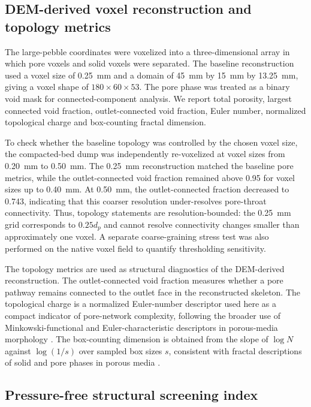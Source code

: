\documentclass[preprint,12pt,authoryear]{elsarticle}
\begin{document}
\subsection{DEM-derived voxel reconstruction and topology metrics}

The large-pebble coordinates were voxelized into a three-dimensional array in which pore voxels and solid voxels were separated. The baseline reconstruction used a voxel size of \SI{0.25}{mm} and a domain of \SI{45}{mm} by \SI{15}{mm} by \SI{13.25}{mm}, giving a voxel shape of $180 \times 60 \times 53$. The pore phase was treated as a binary void mask for connected-component analysis. We report total porosity, largest connected void fraction, outlet-connected void fraction, Euler number, normalized topological charge and box-counting fractal dimension.

To check whether the baseline topology was controlled by the chosen voxel size, the compacted-bed dump was independently re-voxelized at voxel sizes from \SI{0.20}{mm} to \SI{0.50}{mm}. The \SI{0.25}{mm} reconstruction matched the baseline pore metrics, while the outlet-connected void fraction remained above 0.95 for voxel sizes up to \SI{0.40}{mm}. At \SI{0.50}{mm}, the outlet-connected fraction decreased to 0.743, indicating that this coarser resolution under-resolves pore-throat connectivity. Thus, topology statements are resolution-bounded: the \SI{0.25}{mm} grid corresponds to $0.25d_p$ and cannot resolve connectivity changes smaller than approximately one voxel. A separate coarse-graining stress test was also performed on the native voxel field to quantify thresholding sensitivity.

The topology metrics are used as structural diagnostics of the DEM-derived reconstruction. The outlet-connected void fraction measures whether a pore pathway remains connected to the outlet face in the reconstructed skeleton. The topological charge is a normalized Euler-number descriptor used here as a compact indicator of pore-network complexity, following the broader use of Minkowski-functional and Euler-characteristic descriptors in porous-media morphology \citep{Armstrong2019Minkowski}. The box-counting dimension is obtained from the slope of $\log N$ against $\log(1/s)$ over sampled box sizes $s$, consistent with fractal descriptions of solid and pore phases in porous media \citep{Dathe2005Fractal}.

\subsection{Pressure-free structural screening index}
\end{document}
